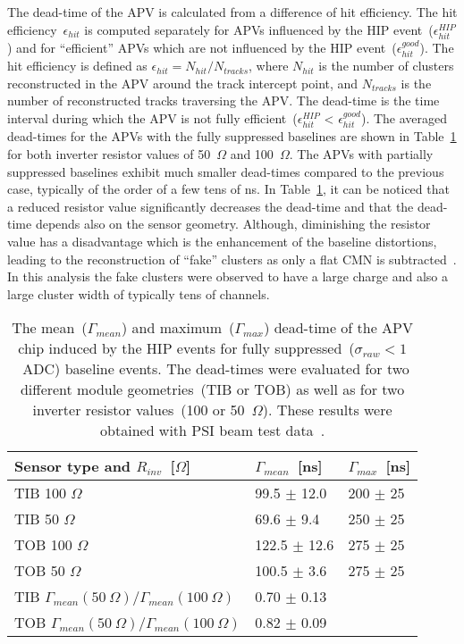 The dead-time of the APV is calculated from a difference of hit efficiency. The hit efficiency~$\epsilon_{hit}$ is computed separately for APVs influenced by the HIP event~($\epsilon_{hit}^{HIP}$) and for ``efficient'' APVs which are not influenced by the HIP event~($\epsilon_{hit}^{good}$). The hit efficiency is defined as $\epsilon_{hit} = N_{hit}/N_{tracks}$, where $N_{hit}$ is the number of clusters reconstructed in the APV around the track intercept point, and $N_{tracks}$ is the number of reconstructed tracks traversing the APV. The dead-time is the time interval during which the APV is not fully efficient~($\epsilon_{hit}^{HIP}$ < $\epsilon_{hit}^{good}$). The averaged dead-times for the APVs with the fully suppressed baselines are shown in Table~\ref{tab:tableDeadtimes} for both inverter resistor values of 50~$\Omega$ and 100~$\Omega$. The APVs with partially suppressed baselines exhibit much smaller dead-times compared to the previous case, typically of the order of a few tens of ns. In Table~\ref{tab:tableDeadtimes}, it can be noticed that a reduced resistor value significantly decreases the dead-time and that the dead-time depends also on the sensor geometry. Although, diminishing the resistor value has a disadvantage which is the enhancement of the baseline distortions, leading to the reconstruction of ``fake'' clusters as only a flat CMN is subtracted~\cite{Bainbridge:2004jc}. In this analysis the fake clusters were observed to have a large charge and also a large cluster width of typically tens of channels. 



\begin{table}[h]
\begin{center}
\begin{tabular}{|l|l|l|}
\hline
Sensor type and $R_{inv}$~[$\Omega$] & $\Gamma_{mean}$~[ns]  & $\Gamma_{max}$~[ns] \\
\hline
\hline
TIB 100 $\Omega$ & 99.5 $\pm$ 12.0 & 200 $\pm$ 25 \\
TIB 50  $\Omega$ & 69.6 $\pm$ 9.4 & 250 $\pm$ 25 \\
TOB 100  $\Omega$ & 122.5 $\pm$ 12.6 & 275 $\pm$ 25 \\
TOB 50 $\Omega$  & 100.5 $\pm$ 3.6 & 275 $\pm$ 25 \\
\hline
TIB $\Gamma_{mean}(50~\Omega )/\Gamma_{mean}(100~\Omega)$ &  0.70 $\pm$ 0.13  & \\
TOB $\Gamma_{mean}(50~\Omega )/\Gamma_{mean}(100~\Omega)$ &  0.82 $\pm$ 0.09 & \\
\hline
\end{tabular}
\caption[Table caption text]{The mean~($\Gamma_{mean}$) and maximum~($\Gamma_{max}$) dead-time of the APV chip induced by the HIP events for fully suppressed~($\sigma_{raw}<1$~ADC) baseline events. The dead-times were evaluated for two different module geometries~(TIB or TOB) as well as for two inverter resistor values~(100 or 50~$\Omega$). These results were obtained with PSI beam test data~\cite{Bainbridge:2004jc}. }
\label{tab:tableDeadtimes}
\end{center}
\end{table}



